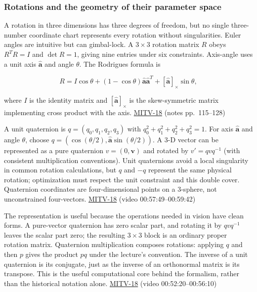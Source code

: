 \subsubsection{Rotations and the geometry of their parameter space}\label{rotations-and-the-geometry-of-their-parameter-space}

A rotation in three dimensions has three degrees of freedom, but no single three-number coordinate chart represents every rotation without singularities. Euler angles are intuitive but can gimbal-lock. A \(3\times3\) rotation matrix \(R\) obeys \(R^TR=I\) and \(\det R=1\), giving nine entries under six constraints. Axis-angle uses a unit axis \(\hat{\mathbf{a}}\) and angle \(\theta\). The Rodrigues formula is

\[
R=I\cos\theta +(1-\cos\theta)\hat{\mathbf{a}}\hat{\mathbf{a}}^T+[\hat{\mathbf{a}}]_\times\sin\theta,
\]

where \(I\) is the identity matrix and \([\hat{\mathbf{a}}]_\times\) is the skew-symmetric matrix implementing cross product with the axis. \hyperref[04-visual-computing-ii-ch036]{MITV-18} (notes pp.~115--128)

A unit quaternion is \(q=(q_0,q_1,q_2,q_3)\) with \(q_0^2+q_1^2+q_2^2+q_3^2=1\). For axis \(\hat{\mathbf{a}}\) and angle \(\theta\), choose \(q=(\cos(\theta/2),\hat{\mathbf{a}}\sin(\theta/2))\). A 3-D vector can be represented as a pure quaternion \(v=(0,\mathbf{v})\) and rotated by \(v'=qv q^{-1}\) (with consistent multiplication conventions). Unit quaternions avoid a local singularity in common rotation calculations, but \(q\) and \(-q\) represent the same physical rotation; optimization must respect the unit constraint and this double cover. Quaternion coordinates are four-dimensional points on a 3-sphere, not unconstrained four-vectors. \hyperref[04-visual-computing-ii-ch036]{MITV-18} (video 00:57:49--00:59:42)

The representation is useful because the operations needed in vision have clean forms. A pure-vector quaternion has zero scalar part, and rotating it by \(qvq^{-1}\) leaves the scalar part zero; the resulting \(3\times3\) block is an ordinary proper rotation matrix. Quaternion multiplication composes rotations: applying \(q\) and then \(p\) gives the product \(pq\) under the lecture's convention. The inverse of a unit quaternion is its conjugate, just as the inverse of an orthonormal matrix is its transpose. This is the useful computational core behind the formalism, rather than the historical notation alone. \hyperref[04-visual-computing-ii-ch036]{MITV-18} (video 00:52:20--00:56:10)

